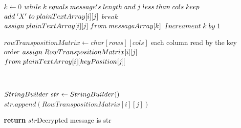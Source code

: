 \documentclass[twoside,twocolumn]{article}
\begin{document}
\begin{algorithm}
\begin{algorithmic}[1]
 
	  \State $k \gets 0$
        	   \State $while \hspace{0.1cm} k \hspace{0.1cm} equals \hspace{0.1cm} message's \hspace{0.1cm} length \hspace{0.1cm} and \hspace{0.1cm} j \hspace{0.1cm} less \hspace{0.1cm} than \hspace{0.1cm} cols \hspace{0.1cm} keep \hspace{0.1cm} $
        	   \State $add \hspace{0.1cm}'X' \hspace{0.1cm} to \hspace{0.1cm} plainTextArray[i][j]$
        	   \State $break$
        	   \State $assign \hspace{0.1cm}  plainTextArray[i][j] \hspace{0.1cm}  from \hspace{0.1cm} messageArray[k]$
        	   \State \footnotesize $Increament\hspace{0.1cm} k\hspace{0.1cm} by \hspace{0.1cm}1$	
        	   \State \footnotesize$ $
		    \EndIf
        \EndFor  
      \EndFor  
         
      \State  $rowTranspositionMatrix \gets char[rows][cols] $
	  	 \Comment \tiny{each column read by the key order}
	  		\State \footnotesize$assign \hspace{0.1cm} RowTranspositionMatrix[i][j]  \hspace{0.1cm}  $ 
	  		\State $from \hspace{0.1cm} plainTextArray[i][keyPosition[j]]$ 
        \EndFor  
      \EndFor    
      
      \State \footnotesize$ $
      
      \State \footnotesize $ StringBuilder\hspace{0.1cm} str \gets StringBuilder()$
        	\State $str.append(RowTranspositionMatrix[i][j])$   	
        \EndFor  
      \EndFor  
      
      \State \textbf{return} $str$\Comment \tiny{Decrypted message is str}
    \EndFunction
  \end{algorithmic}
\end{algorithm}
\end{document}
